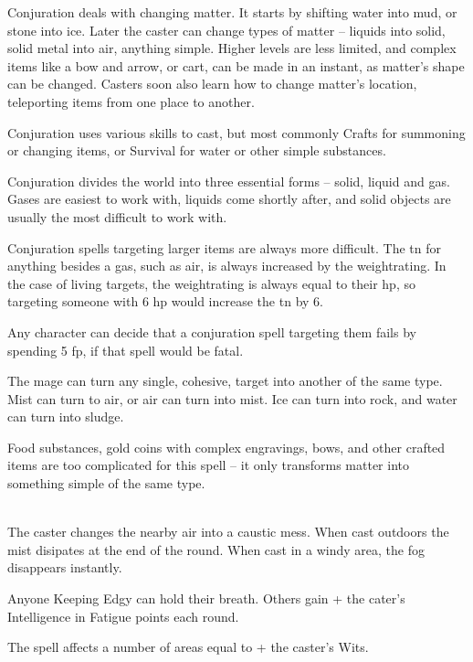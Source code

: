 \begin{multicols}{2}

Conjuration deals with changing matter.
It starts by shifting water into mud, or stone into ice.  Later the caster can change types of matter -- liquids into solid, solid metal into air, anything simple.
Higher levels are less limited, and complex items like a bow and arrow, or cart, can be made in an instant, as matter's shape can be changed.  Casters soon also learn how to change matter's location, teleporting items from one place to another.

Conjuration uses various skills to cast, but most commonly Crafts for summoning or changing items, or Survival for water or other simple substances.

Conjuration divides the world into three essential forms -- solid, liquid and gas.  Gases are easiest to work with, liquids come shortly after, and solid objects are usually the most difficult to work with.

Conjuration spells targeting larger items are always more difficult.  The \gls{tn} for anything besides a gas, such as air, is always increased by the \gls{weightrating}.
In the case of living targets, the \gls{weightrating} is always equal to their \gls{hp}, so targeting someone with 6 \gls{hp} would increase the \gls{tn} by 6.

Any character can decide that a conjuration spell targeting them fails by spending 5 \gls{fp}, if that spell would be fatal.

\spelllevel

The mage can turn any single, cohesive, target into another of the same type.  Mist can turn to air, or air can turn into mist.
Ice can turn into rock, and water can turn into sludge.

Food substances, gold coins with complex engravings, bows, and other crafted items are too complicated for this spell -- it only transforms matter into something simple of the same type.

\\
The caster changes the nearby air into a caustic mess.  When cast outdoors the mist disipates at the end of the \gls{round}.  When cast in a windy area, the fog disappears instantly.

Anyone Keeping Edgy can hold their breath.  Others gain  + the cater's Intelligence in Fatigue points each \gls{round}.

The spell affects a number of areas equal to  + the caster's Wits.


\end{multicols}
